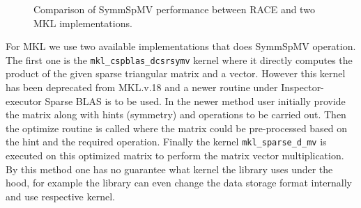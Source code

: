 \begin{figure}[thbp]
	\centering
	\hspace{1em}
	\caption{Comparison of \acrshort{SymmSpMV} performance between \acrshort{RACE} and two \acrshort{MKL} implementations. }
	\label{fig:symm_spmv_mkl}
\end{figure}
For \acrshort{MKL} we use two available implementations that does \acrshort{SymmSpMV} operation. The first one is the \texttt{mkl\_cspblas\_dcsrsymv} kernel where it directly computes the product of the given sparse triangular matrix and a vector. However this kernel has been deprecated from \acrshort{MKL}.v.18 and a newer routine under Inspector-executor Sparse BLAS is to be used. In the newer method user initially provide the matrix along with hints (symmetry) and operations to be carried out. Then the optimize routine is called where the matrix could be pre-processed based on the hint and the required operation. Finally the kernel \texttt{mkl\_sparse\_d\_mv} is executed on this optimized matrix to perform the matrix vector multiplication. By this method one has no guarantee what kernel the library uses under the hood, for example the library can even change the data storage format internally and use respective kernel.

